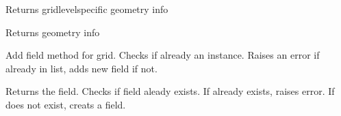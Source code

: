 \documentclass[letterpaper,10pt,english]{sphinxmanual}
\begin{document}
\begin{fulllineitems}
\begin{fulllineitems}
\end{fulllineitems}


\begin{fulllineitems}
\label{\detokenize{autoapi/Workspace/index:Workspace.Workspace.get_dims}}
\sphinxAtStartPar
Returns grid\sphinxhyphen{}level\sphinxhyphen{}specific geometry info

\end{fulllineitems}


\begin{fulllineitems}
\label{\detokenize{autoapi/Workspace/index:Workspace.Workspace.get_geometry}}
\sphinxAtStartPar
Returns geometry info

\end{fulllineitems}


\begin{fulllineitems}
\label{\detokenize{autoapi/Workspace/index:Workspace.Workspace.add_field}}
\sphinxAtStartPar
Add field method for grid. Checks if already an instance.
Raises an error if already in list, adds new field if not.

\end{fulllineitems}


\begin{fulllineitems}
\label{\detokenize{autoapi/Workspace/index:Workspace.Workspace.get_field}}
\sphinxAtStartPar
Returns the field. Checks if field aleady exists.
If already exists, raises error.
If does not exist, creats a field.


\end{fulllineitems}
\end{fulllineitems}
\end{document}
